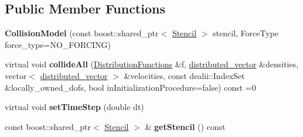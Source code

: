 \subsection*{Public Member Functions}
\begin{DoxyCompactItemize}
\item 
\hypertarget{classnatrium_1_1CollisionModel_a443734919886ea5880be3bba1257758d}{
{\bfseries CollisionModel} (const boost::shared\_\-ptr$<$ \hyperlink{classnatrium_1_1Stencil}{Stencil} $>$ stencil, ForceType force\_\-type=NO\_\-FORCING)}
\label{classnatrium_1_1CollisionModel_a443734919886ea5880be3bba1257758d}

\item 
\hypertarget{classnatrium_1_1CollisionModel_ac6c6d95633d62209a04528af86807025}{
virtual void {\bfseries collideAll} (\hyperlink{classnatrium_1_1DistributionFunctions}{DistributionFunctions} \&f, \hyperlink{namespacenatrium_a903d2b92917f582f2ff05f52160ab811}{distributed\_\-vector} \&densities, vector$<$ \hyperlink{namespacenatrium_a903d2b92917f582f2ff05f52160ab811}{distributed\_\-vector} $>$ \&velocities, const dealii::IndexSet \&locally\_\-owned\_\-dofs, bool inInitializationProcedure=false) const =0}
\label{classnatrium_1_1CollisionModel_ac6c6d95633d62209a04528af86807025}

\item 
\hypertarget{classnatrium_1_1CollisionModel_ab1ec1368662524bb87006f9038b4972d}{
virtual void {\bfseries setTimeStep} (double dt)}
\label{classnatrium_1_1CollisionModel_ab1ec1368662524bb87006f9038b4972d}

\item 
\hypertarget{classnatrium_1_1CollisionModel_ac10edd12e081a6eb48a36568f1bc1c0f}{
const boost::shared\_\-ptr$<$ \hyperlink{classnatrium_1_1Stencil}{Stencil} $>$ \& {\bfseries getStencil} () const }
\label{classnatrium_1_1CollisionModel_ac10edd12e081a6eb48a36568f1bc1c0f}


\end{DoxyCompactItemize}
